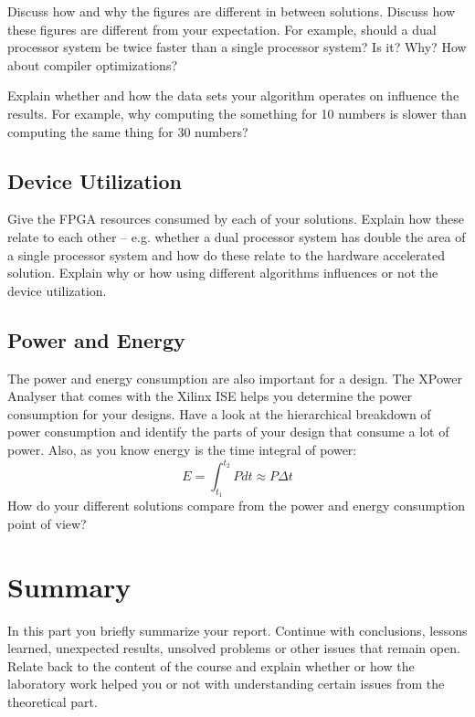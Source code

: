 \documentclass[11pt]{article}
\begin{document}
Discuss how and why the figures are different in between solutions. Discuss how these figures are different from your expectation. For example, should a dual processor system be twice faster than a single processor system? Is it? Why?
How about compiler optimizations? 

Explain whether and how the data sets your algorithm operates on influence the results. For example, why computing the something for 10 numbers is slower than computing the same thing for 30 numbers?

\subsection{Device Utilization}
Give the FPGA resources consumed by each of your solutions. Explain how these relate to each other -- e.g. whether a dual processor system has double the area of a single processor system and how do these relate to the hardware accelerated solution. Explain why or how using different algorithms influences or not the device utilization.

\subsection{Power and Energy}
The power and energy consumption are also important for a design. The XPower Analyser that comes with the Xilinx ISE helps you determine the power consumption for your designs. Have a look at the hierarchical breakdown of power consumption and identify the parts of your design that consume a lot of power. Also, as you know energy is the time integral of power:
\begin{equation}
E = \int_{t_1}^{t_2} P dt \approx P \Delta t
\end{equation}
How do your different solutions compare from the power and energy consumption point of view?

\section{Summary}
In this part you briefly summarize your report. Continue with conclusions, lessons learned, unexpected results, unsolved problems or other issues that remain open. Relate back to the content of the course and explain whether or how the laboratory work helped you or not with understanding certain issues from the theoretical part.



\end{document}
